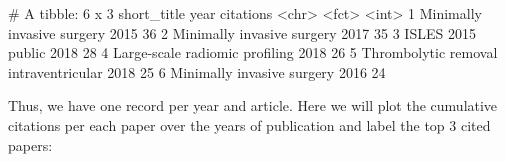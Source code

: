 \begin{Schunk}
\begin{Soutput}
# A tibble: 6 x 3
  short_title                           year  citations
  <chr>                                 <fct>     <int>
1 Minimally invasive surgery            2015         36
2 Minimally invasive surgery            2017         35
3 ISLES 2015 public                     2018         28
4 Large-scale radiomic profiling        2018         26
5 Thrombolytic removal intraventricular 2018         25
6 Minimally invasive surgery            2016         24
\end{Soutput}
\end{Schunk}

Thus, we have one record per year and article. Here we will plot the
cumulative citations per each paper over the years of publication and
label the top 3 cited papers:

